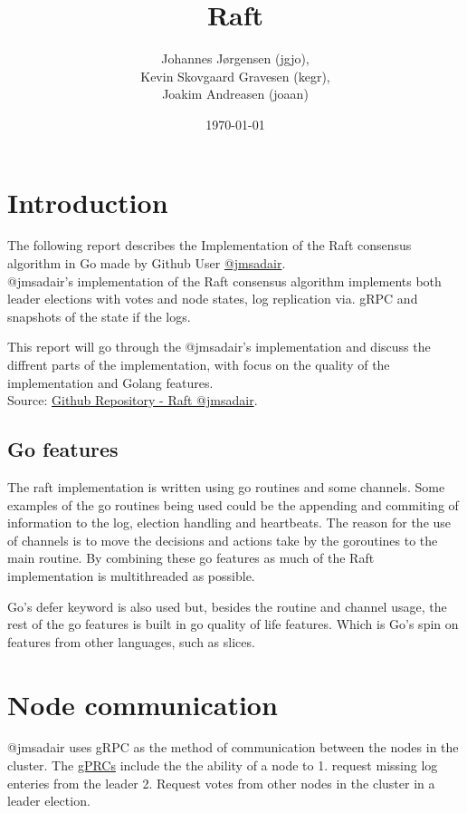 \documentclass[a4paper,11pt]{article}
\title{Raft}
\author{Johannes Jørgensen (jgjo),\\ Kevin Skovgaard Gravesen (kegr),\\ Joakim Andreasen (joaan)}
\date{\today}
\begin{document}
 

\maketitle

\section*{Introduction}
The following report describes the Implementation of the Raft consensus algorithm in Go made by Github User \href{https://github.com/jmsadair/}{@jmsadair}.
\\@jmsadair's implementation of the Raft consensus algorithm implements both leader elections with votes and node states, log replication via. gRPC and snapshots of the state if the logs.

This report will go through the @jmsadair's implementation and discuss the diffrent parts of the implementation, with focus on the quality of the implementation and Golang features.
\\

Source: \href{https://github.com/jmsadair/raft}{Github Repository - Raft @jmsadair}.
\subsection*{Go features}
The raft implementation is written using go routines and some channels.
Some examples of the go routines being used could be the appending and commiting of information to the log, election handling and heartbeats.
The reason for the use of channels is to move the decisions and actions take by the goroutines to the main routine.
By combining these go features as much of the Raft implementation is multithreaded as possible.

Go's defer keyword is also used but, besides the routine and channel usage, the rest of the go features is built in go quality of life features.
Which is Go's spin on features from other languages, such as slices.
\\
\section*{Node communication}
@jmsadair uses gRPC as the method of communication between the nodes in the cluster. The \href{https://github.com/jmsadair/raft/blob/dev/internal/protobuf/raft.proto}{gPRCs} include the the ability of a node to 1. request missing log enteries from the leader 2. Request votes from other nodes in the cluster in a leader election. 
\end{document}
